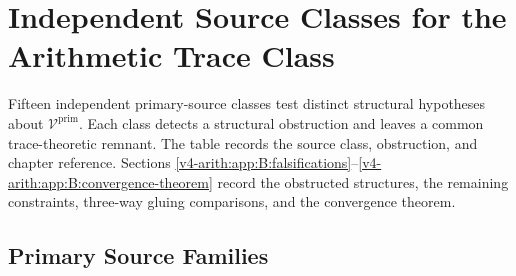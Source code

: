 \chapter{Independent Source Classes for the Arithmetic Trace Class}
\label{v4-arith:app:fifteen-sources}

Fifteen independent primary-source classes test distinct structural
hypotheses about \(\mathcal{V}^{\mathrm{prim}}\). Each class detects a
structural obstruction and leaves a common trace-theoretic remnant. The
table records the source class, obstruction, and chapter reference.
Sections
\ref{v4-arith:app:B:falsifications}--\ref{v4-arith:app:B:convergence-theorem}
record the obstructed structures, the remaining constraints,
three-way gluing comparisons, and the convergence theorem.

\section{Primary Source Families}
\label{v4-arith:app:B:fifteen}

